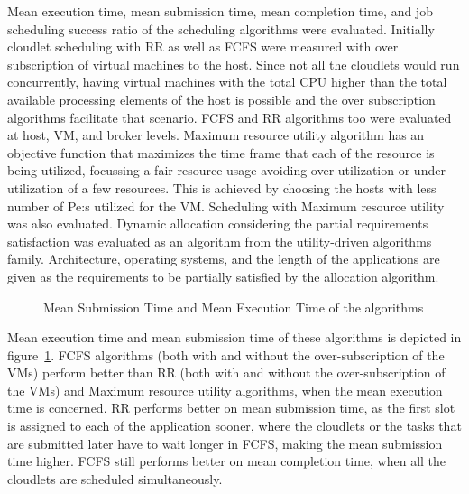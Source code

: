 \documentclass[times, 10pt,twocolumn]{article}
\begin{document}
Mean execution time, mean submission time, mean completion time, and job scheduling success ratio of the scheduling algorithms were evaluated. Initially cloudlet scheduling with RR as well as FCFS were measured with over subscription of virtual machines to the host. Since not all the cloudlets would run concurrently, having virtual machines with the total CPU higher than the total available processing elements of the host is possible and the over subscription algorithms facilitate that scenario. FCFS and RR algorithms too were evaluated at host, VM, and broker levels. Maximum resource utility algorithm has an objective function that maximizes the time frame that each of the resource is being utilized, focussing a fair resource usage avoiding over-utilization or under-utilization of a few resources. This is achieved by choosing the hosts with less number of Pe:s utilized for the VM. Scheduling with Maximum resource utility was also evaluated. Dynamic allocation considering the partial requirements satisfaction was evaluated as an algorithm from the utility-driven algorithms family. Architecture, operating systems, and the length of the applications are given as the requirements to be partially satisfied by the allocation algorithm. 

\begin{figure}[ht]
 \caption{Mean Submission Time and Mean Execution Time of the algorithms}
 \label{fig:met}
\end{figure}

Mean execution time and mean submission time of these algorithms is depicted in figure~\ref{fig:met}. FCFS algorithms (both with and without the over-subscription of the VMs) perform better than RR (both with and without the over-subscription of the VMs) and Maximum resource utility algorithms, when the mean execution time is concerned. RR performs better on mean submission time, as the first slot is assigned to each of the application sooner, where the cloudlets or the tasks that are submitted later have to wait longer in FCFS, making the mean submission time higher. FCFS still performs better on mean completion time, when all the cloudlets are scheduled simultaneously.
\end{document}
